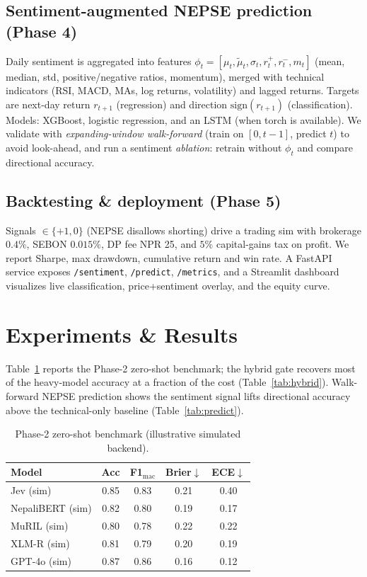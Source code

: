\documentclass[conference]{IEEEtran}
\begin{document}
\subsection{Sentiment-augmented NEPSE prediction (Phase 4)}
Daily sentiment is aggregated into features
$\phi_t = [\mu_t, \tilde{\mu}_t, \sigma_t, r^{+}_t, r^{-}_t, m_t]$ (mean,
median, std, positive/negative ratios, momentum), merged with technical
indicators (RSI, MACD, MAs, log returns, volatility) and lagged returns.
Targets are next-day return $r_{t+1}$ (regression) and direction
$\text{sign}(r_{t+1})$ (classification). Models: XGBoost, logistic
regression, and an LSTM (when torch is available). We validate with
\emph{expanding-window walk-forward} (train on $[0,t-1]$, predict $t$) to
avoid look-ahead, and run a sentiment \emph{ablation}: retrain without
$\phi_t$ and compare directional accuracy.

\subsection{Backtesting \& deployment (Phase 5)}
Signals $\in\{+1,0\}$ (NEPSE disallows shorting) drive a trading sim with
brokerage $0.4\%$, SEBON $0.015\%$, DP fee NPR 25, and $5\%$
capital-gains tax on profit. We report Sharpe, max drawdown, cumulative
return and win rate. A FastAPI service exposes
\texttt{/sentiment}, \texttt{/predict}, \texttt{/metrics}, and a Streamlit
dashboard visualizes live classification, price+sentiment overlay, and
the equity curve.

\section{Experiments \& Results}\label{sec:results}
Table~\ref{tab:bench} reports the Phase-2 zero-shot benchmark; the hybrid
gate recovers most of the heavy-model accuracy at a fraction of the cost
(Table~\ref{tab:hybrid}). Walk-forward NEPSE prediction shows the sentiment
signal lifts directional accuracy above the technical-only baseline
(Table~\ref{tab:predict}).

\begin{table}[t]
\centering\small
\caption{Phase-2 zero-shot benchmark (illustrative simulated backend).}
\label{tab:bench}
\begin{tabular}{lcccc}
\toprule
Model & Acc & F1$_{\text{mac}}$ & Brier$\downarrow$ & ECE$\downarrow$\\
\midrule
Jev (sim)          & 0.85 & 0.83 & 0.21 & 0.40 \\
NepaliBERT (sim)   & 0.82 & 0.80 & 0.19 & 0.17 \\
MuRIL (sim)        & 0.80 & 0.78 & 0.22 & 0.22 \\
XLM-R (sim)        & 0.81 & 0.79 & 0.20 & 0.19 \\
GPT-4o (sim)       & 0.87 & 0.86 & 0.16 & 0.12 \\
\bottomrule
\end{tabular}
\end{table}
\end{document}
